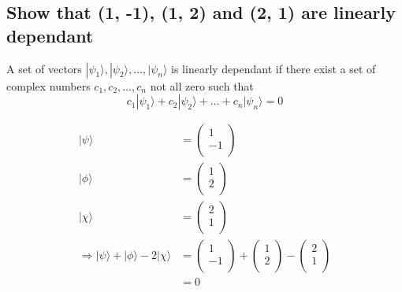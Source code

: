 \documentclass{article}
\begin{document}
\subsection{Show that (1, -1), (1, 2) and (2, 1) are linearly dependant}

A set of vectors $|\psi_1\rangle, |\psi_2\rangle, \dots, |\psi_n\rangle$ is linearly dependant if there exist a set of complex numbers $c_1, c_2, \dots, c_n$ not all zero such that
\begin{equation}
    c_1|\psi_1\rangle + c_2|\psi_2\rangle + \dots + c_n|\psi_n\rangle = 0
\end{equation}

\begin{equation}
    \begin{split}
        |\psi\rangle & = \begin{pmatrix}
            1 \\
            -1 \\
        \end{pmatrix} \\
        |\phi\rangle & = \begin{pmatrix}
            1 \\
            2 \\
        \end{pmatrix} \\
        |\chi\rangle & = \begin{pmatrix}
            2 \\
            1 \\
        \end{pmatrix} \\
        \Longrightarrow |\psi\rangle + |\phi\rangle - 2|\chi\rangle & = \begin{pmatrix}
            1 \\
            -1 \\
        \end{pmatrix} + \begin{pmatrix}
            1 \\
            2 \\
        \end{pmatrix} - \begin{pmatrix}
            2 \\
            1 \\
        \end{pmatrix} \\
        & = 0
    \end{split}
\end{equation}
\end{document}
